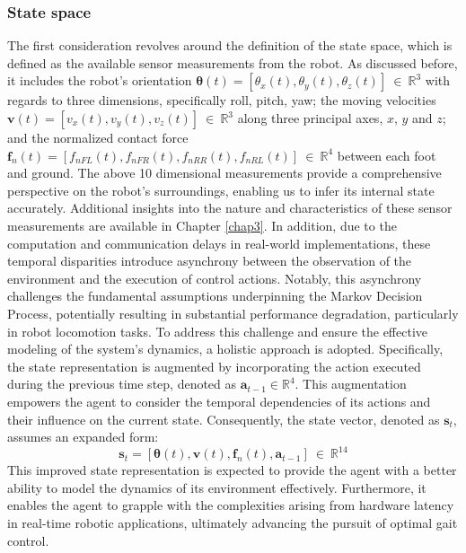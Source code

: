 \subsubsection{State space}
\label{sec:ss}
The first consideration revolves around the definition of the state space, which is defined as the available sensor measurements from the robot. As discussed before, it includes the robot's orientation $\pmb{\theta}(t) =[\theta_x(t),\theta_y(t),\theta_z(t)]\:\in\:\mathbb{R}^3$ with regards to three dimensions, specifically roll, pitch, yaw; the moving velocities $\mathbf{v}(t) =[v_x(t),v_y(t),v_z(t)]\:\in\:\mathbb{R}^3$ along three principal axes, $x$, $y$ and $z$; and the normalized contact force $\mathbf{f}_n(t)=[f_{nFL}(t), f_{nFR}(t), f_{nRR}(t), f_{nRL}(t)]\:\in\:\mathbb{R}^4$ between each foot and ground. The above 10 dimensional measurements provide a comprehensive perspective on the robot's surroundings, enabling us to infer its internal state accurately. Additional insights into the nature and characteristics of these sensor measurements are available in Chapter \ref{chap3}. In addition, due to the computation and communication delays in real-world implementations, these temporal disparities introduce asynchrony between the observation of the environment and the execution of control actions. Notably, this asynchrony challenges the fundamental assumptions underpinning the Markov Decision Process, potentially resulting in substantial performance degradation, particularly in robot locomotion tasks. To address this challenge and ensure the effective modeling of the system's dynamics, a holistic approach is adopted. Specifically, the state representation is augmented by incorporating the action executed during the previous time step, denoted as $\mathbf{a}_{t-1} \in \mathbb{R}^4$. This augmentation empowers the agent to consider the temporal dependencies of its actions and their influence on the current state. Consequently, the state vector, denoted as $\mathbf{s}_t$, assumes an expanded form: $$\mathbf{s}_t =[\pmb{\theta}(t),\mathbf{v}(t),\mathbf{f}_n(t),\mathbf{a}_{t-1}] \:\in\:\mathbb{R}^{14}$$ This improved state representation is expected to provide the agent with a better ability to model the dynamics of its environment effectively. Furthermore, it enables the agent to grapple with the complexities arising from hardware latency in real-time robotic applications, ultimately advancing the pursuit of optimal gait control.
